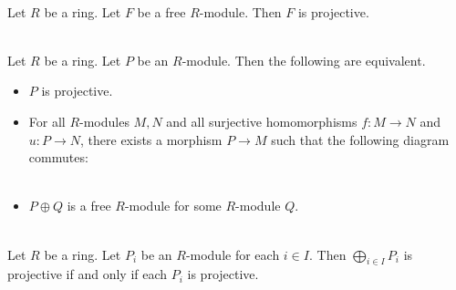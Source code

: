 \documentclass[a4paper]{article}
\begin{document}
\begin{lmm}{}{}\\
Let $R$ be a ring. Let $F$ be a free $R$-module. Then $F$ is projective. 
\end{lmm}

\begin{prp}{}{}\\
Let $R$ be a ring. Let $P$ be an $R$-module. Then the following are equivalent. 
\begin{itemize}
\item $P$ is projective. 
\item For all $R$-modules $M,N$ and all surjective homomorphisms $f:M\to N$ and $u:P\to N$, there exists a morphism $P\to M$ such that the following diagram commutes: \\
\\
\item $P\oplus Q$ is a free $R$-module for some $R$-module $Q$. 
\end{itemize}
\end{prp}

\begin{prp}{}{}\\
Let $R$ be a ring. Let $P_i$ be an $R$-module for each $i\in I$. Then $\bigoplus_{i\in I}P_i$ is projective if and only if each $P_i$ is projective. 
\end{prp}
\end{document}
